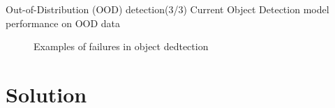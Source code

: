 \documentclass[10pt, aspectratio=169]{beamer}
\begin{document}
\begin{frame}{Out-of-Distribution (OOD) detection(3/3)}
    Current Object Detection model performance on OOD data
    \begin{figure}[!htbp]
        \centering
      \caption[Sample False Positive and False Negative detections]{Examples of failures in object dedtection}
      \label{fig:3}
    \end{figure}
\end{frame}
\section{Solution}
\end{document}
